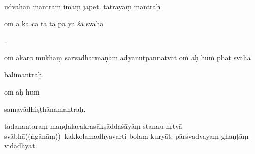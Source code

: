 \documentclass[naipra.tex]{subfiles}
\begin{document}
\begin{sanskrit}

\pstart
{} udvahan mantram imaṃ japet. tatrāyaṃ mantraḥ\Emdash \begin{mantra}oṁ a ka ca ṭa ta pa ya śa svāhā\end{mantra}.
\pend


\pstart
\begin{mantra}oṁ akāro mukhaṃ sarvadharmāṇām ādyanutpannatvāt oṁ āḥ hūṁ phaṭ svāhā\end{mantra}\Emdash balimantraḥ. 
\pend


\pstart
\begin{mantra}oṁ āḥ hūṁ\end{mantra}\Emdash samayādhiṣṭhānamantraḥ. 
\pend



\pstart
tadanantaraṃ maṇḍalacakrasākṣāddaśāyāṃ stanau hṛtvā \crux svābhā((ṅgānāṃ))\crux\ kakkolamadhyavarti bolaṃ kuryāt. pārśvadvayaṃ ghaṇṭāṃ vidadhyāt. 
\pend



\end{sanskrit}
\end{document}
